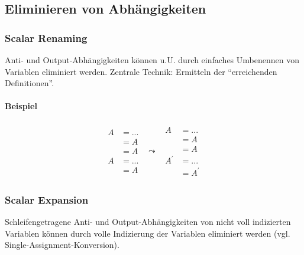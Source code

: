 \def\ins{\hspace{.5cm}}

\subsection{Eliminieren von Abhängigkeiten}

\subsubsection{Scalar Renaming}

Anti- und Output-Abhängigkeiten können u.U. durch einfaches Umbenennen
von Variablen eliminiert werden. Zentrale Technik: Ermitteln der
``erreichenden Definitionen''.

\paragraph{Beispiel}



\[
\begin{array}{ccc}
\begin{aligned}
A &= ... \\
   &= A \\
   &= A \\
A &= ... \\
   &= A
\end{aligned}
&
\leadsto
&
\begin{aligned}
A &= ... \\
   &= A \\
   &= A \\
A^\prime &= ... \\
   &= A^\prime
\end{aligned}
\end{array}
\]



\subsubsection{Scalar Expansion}

Schleifengetragene Anti- und Output-Abhängigkeiten von nicht voll
indizierten Variablen können durch volle Indizierung der Variablen
eliminiert werden (vgl. Single-Assignment-Konversion).



